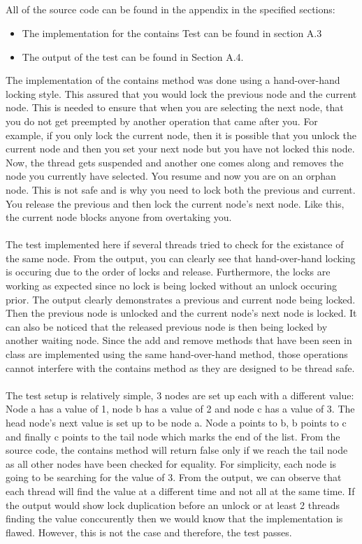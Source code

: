 \documentclass[11pt]{article}
\begin{document}
\subsection{}
All of the source code can be found in the appendix in the specified sections:
\begin{itemize}
	\item The implementation for the contains Test can be found in section A.3
	\item The output of the test can be found in Section A.4.
\end{itemize}

The implementation of the contains method was done using a hand-over-hand locking style. This assured that you would lock the previous node 
and the current node. This is needed to ensure that when you are selecting the next node, that you do not get preempted by another operation 
that came after you. For example, if you only lock the current node, then it is possible that you unlock the current node and then you set your 
next node but you have not locked this node. Now, the thread gets suspended and another one comes along and removes the node you currently have 
selected. You resume and now you are on an orphan node. This is not safe and is why you need to lock both the previous and current. You release 
the previous and then lock the current node's next node. Like this, the current node blocks anyone from overtaking you.
\\\\
The test implemented here if several threads tried to check for the existance of the same node. From the output, you can clearly see that 
hand-over-hand locking is occuring due to the order of locks and release. Furthermore, the locks are working as expected since no lock 
is being locked without an unlock occuring prior. The output clearly demonstrates a previous and current node being locked. Then the 
previous node is unlocked and the current node's next node is locked. It can also be noticed that the released previous node is then 
being locked by another waiting node. Since the add and remove methods that have been seen in class are implemented using the same 
hand-over-hand method, those operations cannot interfere with the contains method as they are designed to be thread safe.
\\\\
The test setup is relatively simple, 3 nodes are set up each with a different value: Node a has a value of 1, node b has a value of 2
and node c has a value of 3. The head node's next value is set up to be node a. Node a points to b, b points to c and finally c points 
to the tail node which marks the end of the list. From the source code, the contains method will return false only if we reach the tail 
node as all other nodes have been checked for equality. For simplicity, each node is going to be searching for the value of 3. From the 
output, we can observe that each thread will find the value at a different time and not all at the same time. If the output would show 
lock duplication before an unlock or at least 2 threads finding the value conccurently then we would know that the implementation is 
flawed. However, this is not the case and therefore, the test passes. 
\end{document}
